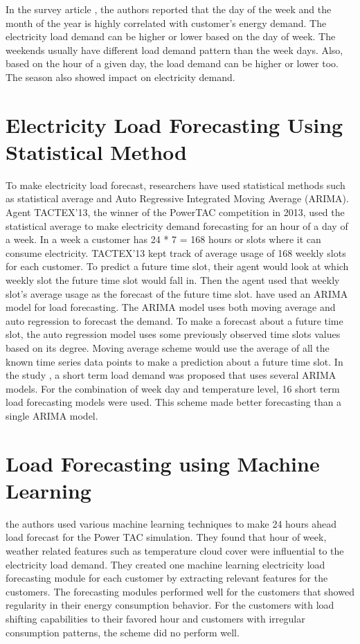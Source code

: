 In the survey article \cite{hahn2009electric}, the authors reported that the day of the week and the month of the year is highly correlated with customer's energy demand. The electricity load demand can be higher or lower based on the day of week. The weekends usually have different load demand pattern than the week days. Also, based on the hour of a given day, the load demand can be higher or lower too. The season also showed impact on electricity demand. 

\section{Electricity Load Forecasting Using Statistical Method}

To make electricity load forecast, researchers have used statistical methods such as statistical average and Auto Regressive Integrated Moving Average (ARIMA).  Agent TACTEX'13, the winner of the PowerTAC competition in 2013, used the statistical average to make electricity demand forecasting for an hour of a day of a week. In a week a customer has 24 * 7 = 168 hours or slots where it can consume electricity. TACTEX'13  kept track of average usage of 168 weekly slots for each customer. To predict a future time slot, their agent would look at which weekly slot the future time slot would fall in. Then the agent used that weekly slot's average usage as the forecast of the future time slot. \cite{cho1995customer} have used an ARIMA model for load forecasting. The ARIMA model uses both moving average and auto regression to forecast the demand. To make a forecast about a future time slot, the auto regression model uses some previously observed time slots values based on its degree. Moving average scheme would use the average of all the known time series data points to make a prediction about a future time slot. In the study \cite{amjady2001short}, a short term load demand was proposed that uses several ARIMA models. For the combination of week day and temperature level, 16 short term load forecasting models were used. This scheme made better forecasting than a single ARIMA model.     


\section{Load Forecasting using Machine Learning}
\cite{parra2013initial} the authors used various machine learning techniques to make 24 hours ahead load forecast for the Power TAC simulation. They found that hour of week, weather related features such as temperature cloud cover were influential to the electricity load demand. They created one machine learning electricity load forecasting module for each customer by extracting relevant features for the customers. The forecasting modules performed well for the customers that showed regularity in their energy consumption behavior. For the customers with load shifting capabilities to their favored hour and customers with irregular consumption patterns, the scheme did no perform well.

